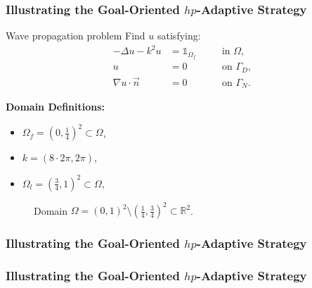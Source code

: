 \begin{frame}
  \frametitle{Illustrating the Goal-Oriented $hp$-Adaptive Strategy}
  
  \begin{block}{Wave propagation problem}
     Find \(u\) satisfying:
    \begin{alignat}{2}
      - \Delta u -k^{2}u   & = \mathds{1}_{\Omega_{f}} &  & \quad \text{in } \Omega, \label{eq:helmholtzgoal} \\
      u                    & = 0                       &  & \quad \text{on } \Gamma_{D}, \\
      \nabla u \cdot \vec{n} & = 0                     &  & \quad \text{on } \Gamma_{N}.
    \end{alignat}
  \end{block}

  \begin{multicols}{2}
    \textbf{Domain Definitions:}
    \begin{itemize}
      \item \(\Omega_{f} = \left(0,\frac{1}{4}\right)^{2} \subset \Omega\), 
      \item \(k = \left(8 \cdot 2 \pi, 2 \pi\right)\), 
      \item \(\Omega_{l} = \left(\frac{3}{4},1\right)^{2} \subset \Omega\),
    \end{itemize}

   \begin{figure}
       \centering
	
	      \caption{Domain \(\Omega = \left(0,1\right)^{2} \setminus \left(\frac{1}{4},\frac{3}{4}\right)^{2} \subset \mathbb{R}^{2}\).}
    \end{figure}

  \end{multicols}

\end{frame}

\begin{frame}
	\frametitle{Illustrating the Goal-Oriented $hp$-Adaptive Strategy}
	\begin{figure}[t!]
	\end{figure}
\end{frame}

\begin{frame}
	\frametitle{Illustrating the Goal-Oriented $hp$-Adaptive Strategy}
\end{frame}